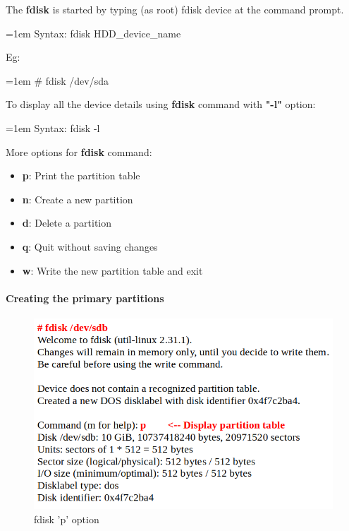 \setlength{\columnsep}{3pt}
\begin{flushleft}
	
	The \textbf{fdisk} is started by typing (as root) fdisk device at the command prompt. 
	\bigskip
	\begin{tcolorbox}[breakable,notitle,boxrule=-0pt,colback=pink,colframe=pink]
		\color{black}
		\font=1em
		Syntax: fdisk HDD\_device\_name
	\end{tcolorbox}

	\bigskip
	Eg:
	\begin{tcolorbox}[breakable,notitle,boxrule=-0pt,colback=black,colframe=black]
		\color{green}
		\font=1em
		\# fdisk /dev/sda
		\font=4pt
	\end{tcolorbox}
	
	To display all the device details using \textbf{fdisk} command with \textbf{"-l"} option:
	\bigskip
	\begin{tcolorbox}[breakable,notitle,boxrule=-0pt,colback=pink,colframe=pink]
		\color{black}
		\font=1em
		Syntax: fdisk -l
		\font=4pt
	\end{tcolorbox}
	
	
	More options for \textbf{fdisk} command:
	\begin{itemize}
				\item \textbf{p}: Print the partition table
				\item \textbf{n}: Create a new partition
				\item \textbf{d}: Delete a partition
				\item \textbf{q}: Quit without saving changes
				\item \textbf{w}: Write the new partition table and exit
	\end{itemize}
\newpage

\paragraph{Creating the primary partitions}

\begin{figure}[h!]
	\centering
	\includegraphics[scale=.4]{content/chapter8/images/fdisk1.png}
	\caption{fdisk 'p' option}
	\label{p_option}
\end{figure}		


\end{flushleft}
